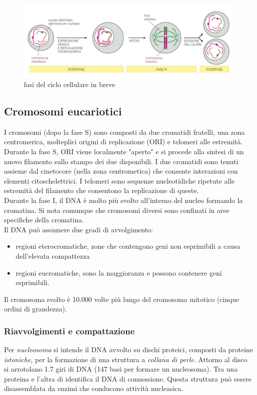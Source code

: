      \begin{figure}[h]
            \centering
            \includegraphics[width=1\textwidth]{images/mitosiBreve.JPG}
            \caption{\small fasi del ciclo cellulare in breve}
            \label{fig:mesh1}
        \end{figure}
    
    \subsection{Cromosomi eucariotici}
        I cromosomi (dopo la fase S) sono composti da due cromatidi fratelli, una zona centromerica, molteplici origini di replicazione (ORI) e telomeri alle estremità.\\
        Durante la fase S, ORI viene localmente "aperto" e si procede alla sintesi di un nuovo filamento sullo stampo dei due disponibili. I due cromatidi sono tenuti assieme dal cinetocore (nella zona centrometica) che consente interazioni con elementi citoschelettrici.
        I telomeri sono sequenze nucleotidiche ripetute alle estremità del filamento che consentono la replicazione di queste.\\
        Durante la fase I, il DNA è molto più svolto all'interno del nucleo formando la cromatina. Si nota comunque che cromosomi diversi sono confinati in aree specifiche della cromatina.\\
        Il DNA può assumere due gradi di avvolgimento:
        \begin{itemize}
            \item regioni eterocromatiche, zone che contengono geni non esprimibili a causa dell'elevata compattezza
            \item regioni eucromatiche, sono la maggioranza e possono contenere geni esprimibili.
        \end{itemize}
        Il cromosoma svolto è 10.000 volte più lungo del cromosoma mitotico (cinque ordini di grandezza).
        
        \subsubsection{Riavvolgimenti e compattazione}
            Per \textit{nucleosoma} si intende il DNA avvolto su dischi proteici, composti da proteine \textit{istoniche}, per la formazione di una struttura a \textit{collana di perle}. Attorno al disco si arrotolano 1.7 giri di DNA (147 basi per formare un nucleosoma). 
            Tra una proteina e l'altra di identifica il DNA di connessione. Questa struttura può essere disassemblata da enzimi che conducono attività nucleasica.\\
            
